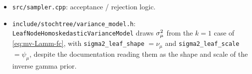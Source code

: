 \begin{description}
\begin{itemize}
		            \texttt{GaussianConstantLeafModel::SplitLogMarginalLikelihood}
		            and \texttt{NoSplitLogMarginalLikelihood} are the two
		            sides of \eqref{eq:mv-lkratio-grow};
		            \texttt{PosteriorParameterMean},
		            \texttt{PosteriorParameterVariance}, and
		            \texttt{SampleLeafParameters} implement
		            \eqref{eq:mv-leaf-fc}.
		      \item \texttt{src/sampler.cpp}: acceptance / rejection logic.
		      \item \texttt{include/stochtree/variance\_model.h}:
		            \texttt{LeafNodeHomoskedasticVarianceModel} draws $\sigma_\mu^{2}$
		            from the $k = 1$ case of \eqref{eq:mv-Lamm-fc}, with
		            \texttt{sigma2\_leaf\_shape} $= \nu_\mu$ and
		            \texttt{sigma2\_leaf\_scale} $= \psi_\mu$, despite the
		            documentation reading them as the shape and scale of the
		            inverse gamma prior.
	      \end{itemize}
\end{description}
